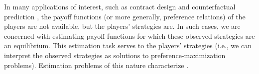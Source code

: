 In many applications of interest, such as contract design \citep{holmstrom1979moral, grossman1992analysis} and counterfactual prediction \citep{peysakhovich2019robust}, the payoff functions (or more generally, preference relations) of the players are not available, but the players' strategies are.
In such cases, we are concerned with estimating payoff functions 
for which these observed strategies are an equilibrium.
This estimation task serves to  the players' strategies (i.e., we can interpret the observed strategies as solutions to preference-maximization problems).
Estimation problems of this nature characterize  \citep{waugh2013computational, bestick2013inverse}.


